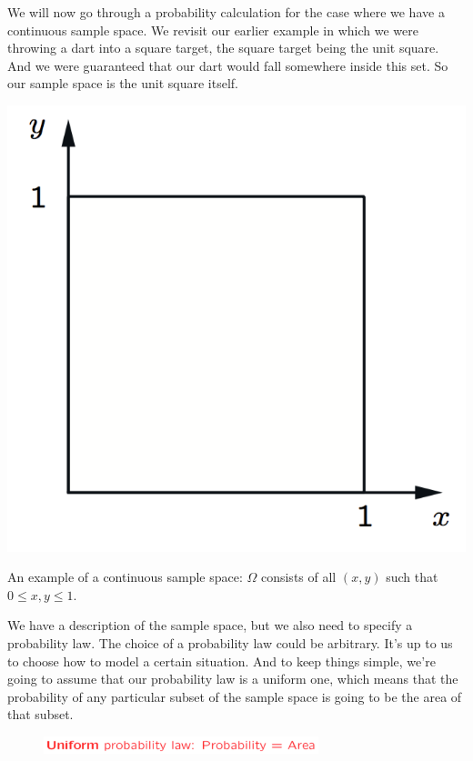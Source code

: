 \documentclass{tufte-handout}
\begin{document}
We will now go through a probability calculation for the case where we have a continuous sample
space. We revisit our earlier example in which we were throwing a dart into a square target, the square
target being the unit square. And we were guaranteed that our dart would fall somewhere inside this
set. So our sample space is the unit square itself.

\begin{marginfigure}
  \includegraphics{ContSampleSpace}
  \caption{An example of a continuous sample space: $\Omega$ consists of all $(x, y)$ such that $0 \leq x, y \leq 1$.}
\end{marginfigure}


We have a description of the sample space, but we also need to
specify a probability law. The choice of a probability law could be arbitrary. It's up to us to choose how to model a
certain situation. And to keep things simple, we're going to assume that our probability law is a uniform
one, which means that the probability of any particular subset of the sample space is going to be the
area of that subset.

\begin{figure}
  \includegraphics[width=8cm]{UniformLaw}
\end{figure}
\end{document}
